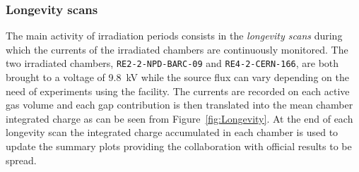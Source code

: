 		\subsubsection{Longevity scans}
		\label{chapt5:sssec:longscan}
	
	The main activity of irradiation periods consists in the \textit{longevity scans} during which the currents of the irradiated chambers are continuously monitored. The two irradiated chambers, \texttt{RE2-2-NPD-BARC-09} and \texttt{RE4-2-CERN-166}, are both brought to a voltage of \SI{9.8}{kV} while the source flux can vary depending on the need of experiments using the facility. The currents are recorded on each active gas volume and each gap contribution is then translated into the mean chamber integrated charge as can be seen from Figure~\ref{fig:Longevity}. At the end of each longevity scan the integrated charge accumulated in each chamber is used to update the summary plots providing the collaboration with official results to be spread.
	
